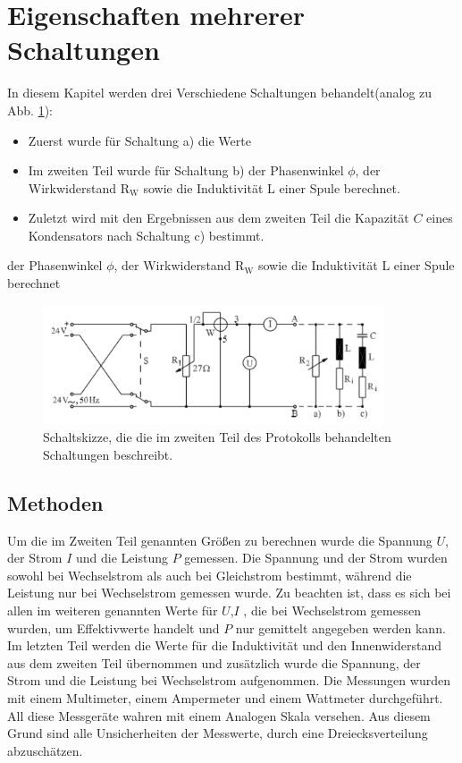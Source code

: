 \section{Eigenschaften mehrerer Schaltungen}
In diesem Kapitel werden  drei Verschiedene Schaltungen behandelt(analog zu Abb. \ref{fig:Leistungsaufnahme}):
\begin{itemize}
	\item Zuerst wurde für Schaltung a) die Werte %
	\item Im zweiten Teil wurde für Schaltung b) der Phasenwinkel $\phi$, der Wirkwiderstand R$_\text{W}$ sowie die Induktivität L einer Spule	 berechnet.
	\item Zuletzt wird mit den Ergebnissen aus dem zweiten Teil die Kapazität $C$ eines Kondensators nach Schaltung c) bestimmt.
\end{itemize}

der Phasenwinkel $\phi$, der Wirkwiderstand R$_\text{W}$ sowie die Induktivität L einer Spule berechnet
\begin{figure}[h]
	\centering
	\includegraphics[width=0.9\textwidth]{res/Schaltskizze.png}
	\caption{Schaltskizze, die die im zweiten Teil des Protokolls behandelten Schaltungen beschreibt. }
	\label{fig:Leistungsaufnahme}
\end{figure}

\subsection{Methoden}\label{kap:MethodenS}
Um die im Zweiten Teil genannten Größen zu berechnen wurde die Spannung $U$, der Strom $I$ und die Leistung $P$ gemessen. 
Die Spannung und der Strom wurden sowohl bei Wechselstrom als auch bei Gleichstrom bestimmt, während die Leistung nur bei Wechselstrom gemessen wurde. Zu beachten ist, dass es sich bei allen im weiteren genannten Werte für $U$,$I$ , die bei Wechselstrom gemessen wurden, um Effektivwerte handelt und $P$ nur gemittelt angegeben werden kann.
Im letzten Teil werden die Werte für die Induktivität und den Innenwiderstand aus dem zweiten Teil übernommen und zusätzlich wurde die Spannung, der Strom und die Leistung bei Wechselstrom aufgenommen.
Die Messungen wurden mit einem Multimeter, einem Ampermeter und einem Wattmeter durchgeführt.
All diese Messgeräte wahren mit einem Analogen Skala versehen. Aus diesem Grund sind alle Unsicherheiten der Messwerte, durch eine Dreiecksverteilung abzuschätzen. 
